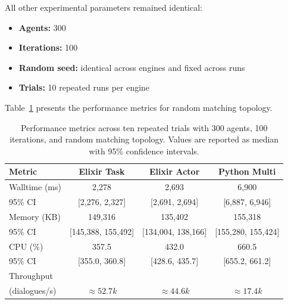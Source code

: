 \documentclass[
]{ceurart}
\begin{document}
All other experimental parameters remained identical:
\begin{itemize}
	\item \textbf{Agents:} 300
	\item \textbf{Iterations:} 100
	\item \textbf{Random seed:} identical across engines and fixed across runs
	\item \textbf{Trials:} 10 repeated runs per engine
\end{itemize}

Table~\ref{tab:runtime_trials_random} presents the performance metrics for random matching topology.

\begin{table}[ht]
\centering
\caption{Performance metrics across ten repeated trials with 300 agents, 100 iterations, and random matching topology.
Values are reported as median with 95\% confidence intervals.}\label{tab:runtime_trials_random}
\begin{tabular}{lccc}
\toprule
Metric & Elixir Task & Elixir Actor & Python Multi \\
\midrule
Walltime (ms) & 2,278 & 2,693 & 6,900 \\
95\% CI & [2,276, 2,327] & [2,691, 2,694] & [6,887, 6,946] \\
Memory (KB) & 149,316 & 135,402 & 155,318 \\
95\% CI & [145,388, 155,492] & [134,004, 138,166] & [155,280, 155,424] \\
CPU (\%) & 357.5 & 432.0 & 660.5 \\
95\% CI & [355.0, 360.8] & [428.6, 435.7] & [655.2, 661.2] \\
Throughput\\ 
(dialogues/s) & $\approx 52.7k$ & $\approx 44.6k$ & $\approx 17.4k$  \\
\bottomrule
\end{tabular}
\end{table}
\end{document}
